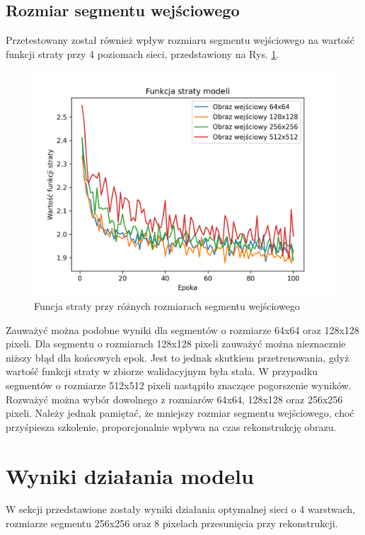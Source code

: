 \documentclass[a4paper, 12pt]{article}
\begin{document}
\subsection{Rozmiar segmentu wejściowego}
Przetestowany został również wpływ rozmiaru segmentu wejściowego na wartość funkcji straty przy 4 poziomach sieci, przedstawiony na Rys. \ref{fig:size}.
\begin{figure}[h!]
\begin{center}
	\includegraphics[width=0.7\columnwidth]{size.png}
	\caption{Funcja straty przy różnych rozmiarach segmentu wejściowego}
	\label{fig:size}
\end{center}
\end{figure}
Zauważyć można podobne wyniki dla segmentów o rozmiarze 64x64 oraz 128x128 pixeli.
Dla segmentu o rozmiarach 128x128 pixeli zauważyć można nieznacznie niższy błąd dla końcowych epok.
Jest to jednak skutkiem przetrenowania, gdyż wartość funkcji straty w zbiorze walidacyjnym była stała.
W przypadku segmentów o rozmiarze 512x512 pixeli nastąpiło znaczące pogorszenie wyników.
Rozważyć można wybór dowolnego z rozmiarów 64x64, 128x128 oraz 256x256 pixeli.
Należy jednak pamiętać, że mniejszy rozmiar segmentu wejściowego, choć przyśpiesza szkolenie,
proporcjonalnie wpływa na czas rekonstrukcję obrazu.

\section{Wyniki działania modelu}
W sekcji przedstawione zostały wyniki działania optymalnej sieci o 4 warstwach,
rozmiarze segmentu 256x256 oraz 8 pixelach przesunięcia przy rekonstrukcji.
\newpage
\end{document}
